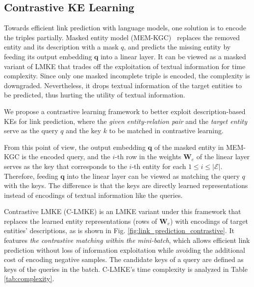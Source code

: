 \documentclass{article}
\newcommand{\wxt}[1]{{#1}}
\begin{document}
\subsection{Contrastive KE Learning}

Towards efficient link prediction with language models, 
one solution is to encode the triples partially.
Masked entity model (MEM-KGC)~\cite{choi2021memkgc} replaces the removed entity and its description with a mask $q$, and predicts the missing entity by feeding its output embedding $\textbf{q}$ into a linear layer.
It can be viewed as a masked variant of LMKE that trades off the exploitation of textual information for time complexity.
Since only one masked incomplete triple is encoded, the complexity is downgraded.
Nevertheless, it drops textual information of the target entities to be predicted, thus hurting the utility of textual information. 









We propose a contrastive learning framework to \wxt{better exploit} description-based KEs for link prediction,
where the \emph{given entity-relation pair} and the \emph{target entity} serve as the query $q$ and the key $k$ to be matched in contrastive learning. 





From this point of view, the output embedding $\textbf{q}$ of the masked entity in MEM-KGC is the encoded query, and the $i$-th row in the weights $\textbf{W}_{e}$ of the linear layer serves as the key that corresponds to the $i$-th entity for each $1\leq i\leq |\mathcal{E}|$.
Therefore, feeding $\textbf{q}$ into the linear layer can be viewed as matching the query $q$ with the keys. 
The difference is that the keys are directly learned representations instead of encodings of textual information like the queries. 

Contrastive LMKE (C-LMKE) is an LMKE variant under this framework that replaces the learned entity representations (rows of $\textbf{W}_{e}$) with encodings of target entities' descriptions, as is shown in Fig. \ref{fig:link_prediction_contrastive}. 
\wxt{It features \emph{the contrastive matching within the mini-batch}, which allows efficient link prediction without loss of information exploitation while avoiding the additional
cost of encoding negative samples.}
The candidate keys of a query are defined as keys of the queries in the batch.
C-LMKE's time complexity is analyzed in Table \ref{tab:complexity}.
\end{document}
